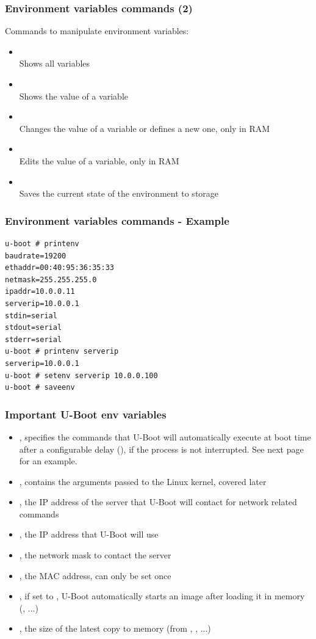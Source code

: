 \begin{frame}
  \frametitle{Environment variables commands (2)}
  Commands to manipulate environment variables:
  \begin{itemize}
    \item {}\\
      Shows all variables
    \item {}\\
      Shows the value of a variable
    \item {}\\
      Changes the value of a variable or defines a new one, only in RAM
    \item {}\\
      Edits the value of a variable, only in RAM
    \item {}\\
      Saves the current state of the environment to storage
  \end{itemize}
\end{frame}

\begin{frame}[fragile]
\frametitle{Environment variables commands - Example}
\begin{verbatim}
u-boot # printenv
baudrate=19200
ethaddr=00:40:95:36:35:33
netmask=255.255.255.0
ipaddr=10.0.0.11
serverip=10.0.0.1
stdin=serial
stdout=serial
stderr=serial
u-boot # printenv serverip
serverip=10.0.0.1
u-boot # setenv serverip 10.0.0.100
u-boot # saveenv
\end{verbatim}
\end{frame}

\begin{frame}
  \frametitle{Important U-Boot env variables}
  \begin{itemize}
  \item {}, specifies the commands that U-Boot will
    automatically execute at boot time after a configurable delay
    (), if the process is not interrupted. See next
    page for an example.
  \item {}, contains the arguments passed to the Linux
    kernel, covered later
  \item {}, the IP address of the server that U-Boot will
    contact for network related commands
  \item {}, the IP address that U-Boot will use
  \item {}, the network mask to contact the server
  \item {}, the MAC address, can only be set once
  \item {}, if set to , U-Boot automatically
    starts an image after loading it in memory (,
    ...)
  \item {}, the size of the latest copy to memory
    (from , , ...)
  \end{itemize}
\end{frame}

